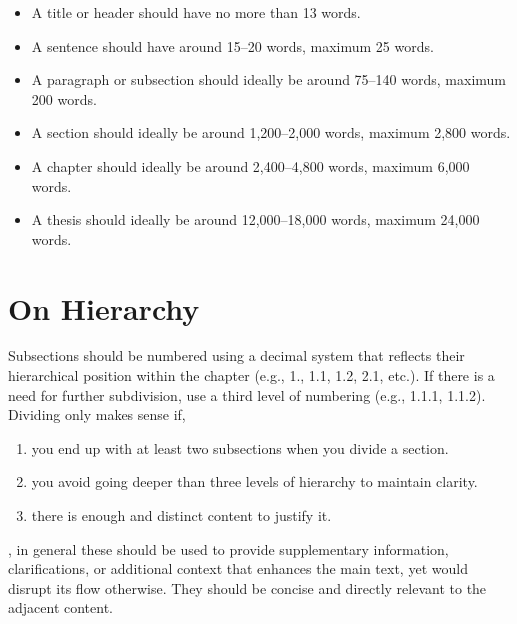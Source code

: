 \documentclass{../sharedAssets/tufte}
\begin{document}
  \begin{itemize}
    \item A title or header should have no more than 13 words.
    \item A sentence should have around 15–20 words, maximum 25 words.
    \item A paragraph or subsection should ideally be around 75–140 words, maximum 200 words.
    \item A section should ideally be around 1,200–2,000 words, maximum 2,800 words.
    \item A chapter should ideally be around 2,400–4,800 words, maximum 6,000 words.
    \item A thesis should ideally be around 12,000–18,000 words, maximum 24,000 words.
  \end{itemize}

\section{On Hierarchy}
Subsections should be numbered using a decimal system that reflects their hierarchical position within the chapter (e.g., 1., 1.1, 1.2, 2.1, etc.).
If there is a need for further subdivision, use a third level of numbering (e.g., 1.1.1, 1.1.2).
Dividing only makes sense if,
\begin{enumerate}[label=\alph*)]
    \item you end up with at least two subsections when you divide a section.
    \item you avoid going deeper than three levels of hierarchy to maintain clarity.
    \item there is enough and distinct content to justify it.
\end{enumerate}

, in general these should be used to provide supplementary information,
clarifications, or additional context that enhances the main text, yet would disrupt its flow otherwise.
They should be concise and directly relevant to the adjacent content. 
\end{document}
